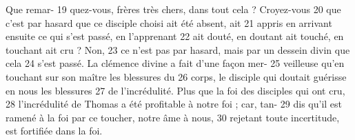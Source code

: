 Que remar-	 
19	 	quez-vous, frères très chers, dans tout cela ? Croyez-vous	 
20	 	que c'est par hasard que ce disciple choisi ait été absent, ait	 
21	 	appris en arrivant ensuite ce qui s'est passé, en l'apprenant	 
22	 	ait douté, en doutant ait touché, en touchant ait cru ? Non,	 
23	 	ce n'est pas par hasard, mais par un dessein divin que cela	 
24	 	s'est passé. La clémence divine a fait d'une façon mer-	 
25	 	veilleuse qu'en touchant sur son maître les blessures du	 
26	 	corps, le disciple qui doutait guérisse en nous les blessures	 
27	 	de l'incrédulité. Plus que la foi des disciples qui ont cru,	 
28	 	l'incrédulité de Thomas a été profitable à notre foi ; car, tan-	 
29	 	dis qu'il est ramené à la foi par ce toucher, notre âme à nous,	 
30	 	rejetant toute incertitude, est fortifiée dans la foi.